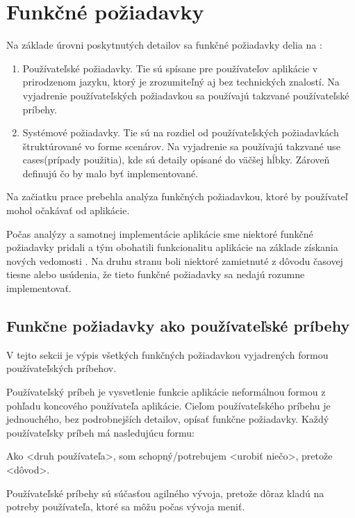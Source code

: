 \section{Funkčné požiadavky}
Na základe úrovni poskytnutých detailov sa funkčné požiadavky delia na :
\begin{enumerate}
      \item Používateľské požiadavky. Tie sú spísane pre používateľov aplikácie v prirodzenom
            jazyku, ktorý je zrozumiteľný aj bez technických znalostí. Na vyjadrenie používateľských požiadavkou sa používajú
            takzvané používateľské príbehy.
      \item Systémové požiadavky. Tie sú na rozdiel od používateľských požiadavkách štruktúrované vo forme
            scenárov. Na vyjadrenie sa používajú takzvané use cases(prípady použitia), kde sú detaily opísané do väčšej hĺbky.
            Zároveň definujú čo by malo byť implementované.
\end{enumerate}

Na začiatku prace prebehla analýza funkčných požiadavkou, ktoré by používateľ mohol očakávať od aplikácie.

Počas analýzy a samotnej implementácie aplikácie sme niektoré funkčné požiadavky pridali a tým obohatili funkcionalitu aplikácie
na základe získania nových vedomosti . Na druhu stranu boli niektoré zamietnuté z dôvodu časovej
tiesne alebo usúdenia, že tieto funkčné požiadavky sa nedajú rozumne implementovať.


\subsection{Funkčne požiadavky ako používateľské príbehy}
V tejto sekcii je výpis všetkých funkčných požiadavkou vyjadrených formou používateľských príbehov.

Používateľský príbeh je vysvetlenie funkcie aplikácie neformálnou formou z pohľadu
koncového používateľa aplikácie. Cieľom používateľského príbehu je jednouchého, bez
podrobnejších detailov, opísať funkčne požiadavky. Každý používateľsky príbeh má nasledujúcu formu:

\begin{code}
      Ako <druh používateľa>,
      som schopný/potrebujem <urobiť niečo>,
      pretože <dôvod>.
\end{code}

Používateľské príbehy sú súčasťou agilného vývoja,
pretože dôraz kladú na potreby používateľa, ktoré sa môžu počas vývoja meniť.

